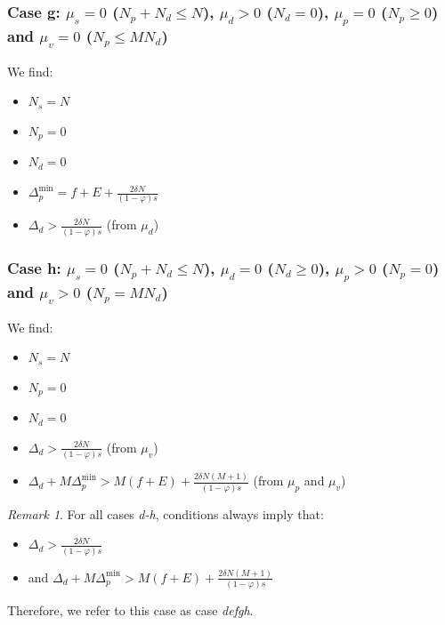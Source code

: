 \documentclass[english, a4paper]{article}
\theoremstyle{plain}
\theoremstyle{definition}
\theoremstyle{remark}
\newtheorem{remark}{Remark}
\begin{document}
    \subsubsection{Case g: $\mu_s = 0$ ($N_p + N_d \leq N$), $\mu_d > 0$ ($N_d = 0$), $\mu_p = 0$ ($N_p \geq 0$) and $\mu_v = 0$ ($N_p \leq MN_d$)}

    We find:
    
    \begin{itemize}
        \item $N_s = N$
        \item $N_p = 0$
        \item $N_d = 0$
        \item $\Delta_p^{\text{min}} = f+ E + \frac{2\delta N}{(1 - \varphi) s}$
        \item $\Delta_d >\frac{2\delta N}{(1 - \varphi) s}$ (from $\mu_d$)
    \end{itemize}
    

    \subsubsection{Case h: $\mu_s = 0$ ($N_p + N_d \leq N$), $\mu_d = 0$ ($N_d \geq 0$), $\mu_p > 0$ ($N_p = 0$) and $\mu_v > 0$ ($N_p = MN_d$)}

    We find:

    \begin{itemize}
        \item $N_s = N$
        \item $N_p = 0$
        \item $N_d = 0$
        \item $\Delta_d >\frac{2\delta N}{(1 - \varphi) s}$ (from $\mu_v$)
        \item $\Delta_d + M \Delta_p^{\text{min}} > M(f+ E) + \frac{2\delta N (M+1)}{(1 - \varphi) s}$ (from $\mu_p$ and $\mu_v$)
    \end{itemize}

    \begin{remark}
        For all cases \emph{d-h}, conditions always imply that:

        \begin{itemize}
        \item $\Delta_d >\frac{2\delta N}{(1 - \varphi) s}$
        \item and $\Delta_d + M \Delta_p^{\text{min}} > M(f+ E) + \frac{2\delta N (M+1)}{(1 - \varphi) s}$
        \end{itemize}
        Therefore, we refer to this case as case \emph{defgh}.
    \end{remark}
\end{document}
